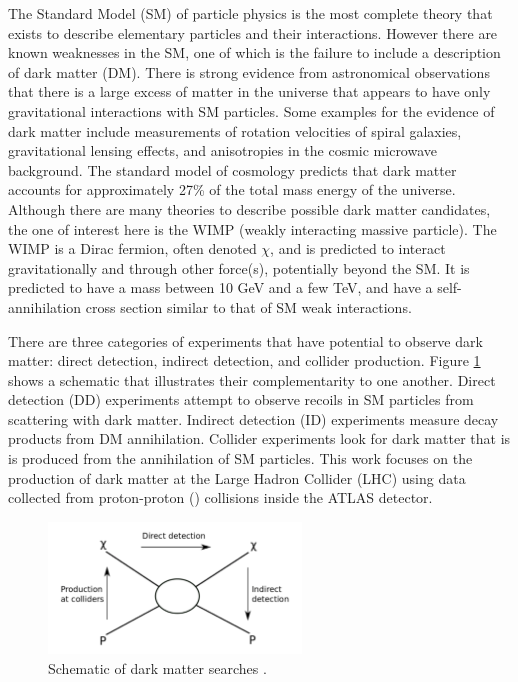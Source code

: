 \label{chapter:introduction}

The Standard Model (SM) of particle physics is the most complete theory that exists to describe elementary particles and their interactions. However there are known weaknesses in the SM, one of which is the failure to include a description of dark matter (DM). There is strong evidence from astronomical observations that there is a large excess of matter in the universe that appears to have only gravitational interactions with SM particles. Some examples for the evidence of dark matter include measurements of rotation velocities of spiral galaxies, gravitational lensing effects, and anisotropies in the cosmic microwave background. The standard model of cosmology predicts that dark matter accounts for approximately 27\% of the total mass energy of the universe. Although there are many theories to describe possible dark matter candidates, the one of interest here is the WIMP (weakly interacting massive particle). The WIMP is a Dirac fermion, often denoted $\chi$, and is predicted to interact gravitationally and through other force(s), potentially beyond the SM. It is predicted to have a mass between 10 GeV and a few TeV, and have a self-annihilation cross section similar to that of SM weak interactions.

There are three categories of experiments that have potential to observe dark matter: direct detection, indirect detection, and collider production. Figure \ref{fig:detection} shows a schematic that illustrates their complementarity to one another. Direct detection (DD) experiments attempt to observe recoils in SM particles from scattering with dark matter. Indirect detection (ID) experiments measure decay products from DM annihilation. Collider experiments look for dark matter that is is produced from the annihilation of SM particles. This work focuses on the production of dark matter at the Large Hadron Collider (LHC) using data collected from proton-proton (\pp) collisions inside the ATLAS detector.

\begin{figure}[htb]
\centering
\includegraphics[width=0.6\textwidth]{Figures/detection.png}
\caption{Schematic of dark matter searches \cite{Undagoitia:2015gya}.}
\label{fig:detection}
\end{figure}

